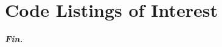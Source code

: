 \documentclass[12pt, a4paper]{article}
\begin{document}
\section{Code Listings of Interest}







\vfill
\begin{center}
  \textbf{\textit{Fin.}}
  \label{Fin}
\end{center}
\end{document}
